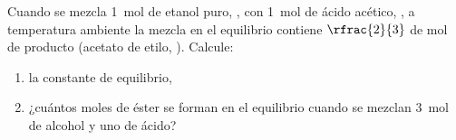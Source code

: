 Cuando se mezcla \SI{1}{\mol} de etanol puro, , con \SI{1}{\mol} de ácido acético, , a temperatura ambiente la mezcla en el equilibrio contiene $\rfrac{2}{3}$ de \si{\mol} de producto (acetato de etilo, ). Calcule:
\begin{enumerate}[label={\alph*)},font=\bfseries]
	\item la constante de equilibrio,
	\item ¿cuántos moles de éster se forman en el equilibrio cuando se mezclan \SI{3}{\mol} de alcohol y uno de ácido?
\end{enumerate}
